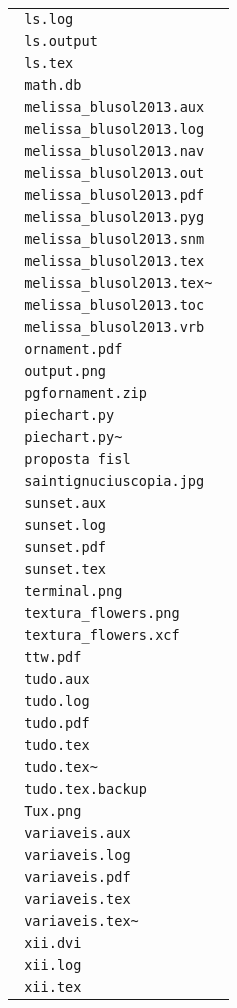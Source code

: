 \documentclass{article}
\begin{document}
\begin{center}
\begin{longtable}{|l|}
\verb+ ls.log +\\ 
\verb+ ls.output +\\ 
\verb+ ls.tex +\\ 
\verb+ math.db +\\ 
\verb+ melissa_blusol2013.aux +\\ 
\verb+ melissa_blusol2013.log +\\ 
\verb+ melissa_blusol2013.nav +\\ 
\verb+ melissa_blusol2013.out +\\ 
\verb+ melissa_blusol2013.pdf +\\ 
\verb+ melissa_blusol2013.pyg +\\ 
\verb+ melissa_blusol2013.snm +\\ 
\verb+ melissa_blusol2013.tex +\\ 
\verb+ melissa_blusol2013.tex~ +\\ 
\verb+ melissa_blusol2013.toc +\\ 
\verb+ melissa_blusol2013.vrb +\\ 
\verb+ ornament.pdf +\\ 
\verb+ output.png +\\ 
\verb+ pgfornament.zip +\\ 
\verb+ piechart.py +\\ 
\verb+ piechart.py~ +\\ 
\verb+ proposta fisl +\\ 
\verb+ saintignuciuscopia.jpg +\\ 
\verb+ sunset.aux +\\ 
\verb+ sunset.log +\\ 
\verb+ sunset.pdf +\\ 
\verb+ sunset.tex +\\ 
\verb+ terminal.png +\\ 
\verb+ textura_flowers.png +\\ 
\verb+ textura_flowers.xcf +\\ 
\verb+ ttw.pdf +\\ 
\verb+ tudo.aux +\\ 
\verb+ tudo.log +\\ 
\verb+ tudo.pdf +\\ 
\verb+ tudo.tex +\\ 
\verb+ tudo.tex~ +\\ 
\verb+ tudo.tex.backup +\\ 
\verb+ Tux.png +\\ 
\verb+ variaveis.aux +\\ 
\verb+ variaveis.log +\\ 
\verb+ variaveis.pdf +\\ 
\verb+ variaveis.tex +\\ 
\verb+ variaveis.tex~ +\\ 
\verb+ xii.dvi +\\ 
\verb+ xii.log +\\ 
\verb+ xii.tex +\\ 
\hline
\end{longtable}
\end{center}
\end{document}

